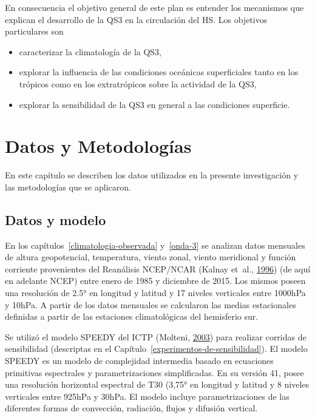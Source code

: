 \documentclass[spanish,a4paper,12pt,oneside]{book}
\providecommand{\tightlist}{%
  \setlength{\itemsep}{0pt}\setlength{\parskip}{0pt}}
\begin{document}
En consecuencia el objetivo general de este plan es entender los
mecanismos que explican el desarrollo de la QS3 en la circulación del
HS. Los objetivos particulares son

\begin{itemize}
\tightlist
\item
  caracterizar la climatología de la QS3,
\item
  explorar la influencia de las condiciones oceánicas superficiales
  tanto en los trópicos como en los extratrópicos sobre la actividad de
  la QS3,
\item
  explorar la sensibilidad de la QS3 en general a las condiciones
  superficie.
\end{itemize}

\chapter{Datos y Metodologías}\label{datos-y-metodologias}

En este capítulo se describen los datos utilizados en la presente
investigación y las metodologías que se aplicaron.

\section{Datos y modelo}\label{datos-y-modelo}

En los capítulos~\ref{climatologia-observada} y~\ref{onda-3} se analizan
datos mensuales de altura geopotencial, temperatura, viento zonal,
viento meridional y función corriente provenientes del Reanálisis
NCEP/NCAR (Kalnay et~al., \protect\hyperlink{ref-Kalnay1996}{1996}) (de
aquí en adelante NCEP) entre enero de 1985 y diciembre de 2015. Los
mismos poseen una resolución de 2.5° en longitud y latitud y 17 niveles
verticales entre 1000hPa y 10hPa. A partir de los datos mensuales se
calcularon las medias estacionales definidas a partir de las estaciones
climatológicas del hemisferio sur.

Se utilizó el modelo SPEEDY del ICTP (Molteni,
\protect\hyperlink{ref-Molteni2003}{2003}) para realizar corridas de
sensibilidad (descriptas en el
Capítulo~\ref{experimentos-de-sensibilidad}). El modelo SPEEDY es un
modelo de complejidad intermedia basado en ecuaciones primitivas
espectrales y parametrizaciones simplificadas. En su versión 41, posee
una resolución horizontal espectral de T30 (3,75° en longitud y latitud
y 8 niveles verticales entre 925hPa y 30hPa. El modelo incluye
parametrizaciones de las diferentes formas de convección, radiación,
flujos y difusión vertical.
\end{document}
